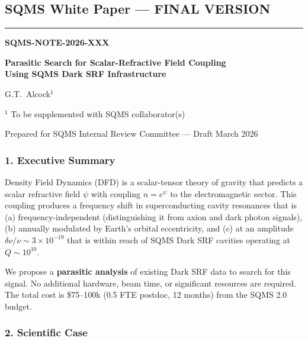 \documentclass[11pt,a4paper]{article}
\begin{document}
\subsection{SQMS White Paper --- FINAL VERSION}

\noindent\rule{\textwidth}{0.5pt}

\begin{center}
{\large\textbf{SQMS-NOTE-2026-XXX}}

\vspace{6pt}
{\Large\textbf{Parasitic Search for Scalar-Refractive Field Coupling\\Using SQMS Dark SRF Infrastructure}}

\vspace{6pt}
G.T.~Alcock$^{1}$

\vspace{3pt}
{\small $^1$ To be supplemented with SQMS collaborator(s)}

\vspace{6pt}
{\small Prepared for SQMS Internal Review Committee --- Draft March 2026}
\end{center}

\vspace{6pt}

\subsubsection*{1. Executive Summary}

Density Field Dynamics (DFD) is a scalar-tensor theory of gravity that predicts a scalar refractive field $\psi$ with coupling $n = e^\psi$ to the electromagnetic sector. This coupling produces a frequency shift in superconducting cavity resonances that is (a) frequency-independent (distinguishing it from axion and dark photon signals), (b) annually modulated by Earth's orbital eccentricity, and (c) at an amplitude $\delta\nu/\nu \sim 3 \times 10^{-19}$ that is within reach of SQMS Dark SRF cavities operating at $Q \sim 10^{10}$.

We propose a \textbf{parasitic analysis} of existing Dark SRF data to search for this signal. No additional hardware, beam time, or significant resources are required. The total cost is \$75--100k (0.5 FTE postdoc, 12 months) from the SQMS 2.0 budget.

\subsubsection*{2. Scientific Case}
\end{document}

